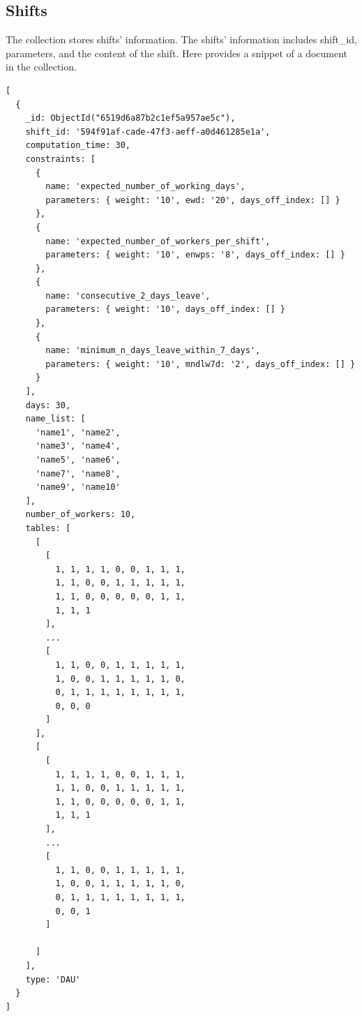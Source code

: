 \documentclass[11pt, oneside]{article}   	%
\begin{document}
\subsection{Shifts}
The collection stores shifts' information. The shifts' information includes shift\_id, parameters, and the content of the shift. Here provides a snippet of a document in the collection.
\begin{verbatim}
[
  {
    _id: ObjectId("6519d6a87b2c1ef5a957ae5c"),
    shift_id: '594f91af-cade-47f3-aeff-a0d461285e1a',
    computation_time: 30,
    constraints: [
      {
        name: 'expected_number_of_working_days',
        parameters: { weight: '10', ewd: '20', days_off_index: [] }
      },
      {
        name: 'expected_number_of_workers_per_shift',
        parameters: { weight: '10', enwps: '8', days_off_index: [] }
      },
      {
        name: 'consecutive_2_days_leave',
        parameters: { weight: '10', days_off_index: [] }
      },
      {
        name: 'minimum_n_days_leave_within_7_days',
        parameters: { weight: '10', mndlw7d: '2', days_off_index: [] }
      }
    ],
    days: 30,
    name_list: [
      'name1', 'name2',
      'name3', 'name4',
      'name5', 'name6',
      'name7', 'name8',
      'name9', 'name10'
    ],
    number_of_workers: 10,
    tables: [
      [
        [
          1, 1, 1, 1, 0, 0, 1, 1, 1,
          1, 1, 0, 0, 1, 1, 1, 1, 1,
          1, 1, 0, 0, 0, 0, 0, 1, 1,
          1, 1, 1
        ],
        ...
        [
          1, 1, 0, 0, 1, 1, 1, 1, 1,
          1, 0, 0, 1, 1, 1, 1, 1, 0,
          0, 1, 1, 1, 1, 1, 1, 1, 1,
          0, 0, 0
        ]
      ],
      [
      	[
          1, 1, 1, 1, 0, 0, 1, 1, 1,
          1, 1, 0, 0, 1, 1, 1, 1, 1,
          1, 1, 0, 0, 0, 0, 0, 1, 1,
          1, 1, 1
        ],
        ...
        [
          1, 1, 0, 0, 1, 1, 1, 1, 1,
          1, 0, 0, 1, 1, 1, 1, 1, 0,
          0, 1, 1, 1, 1, 1, 1, 1, 1,
          0, 0, 1
        ]

      ]
    ],
    type: 'DAU'
  }
]
\end{verbatim}
\end{document}
